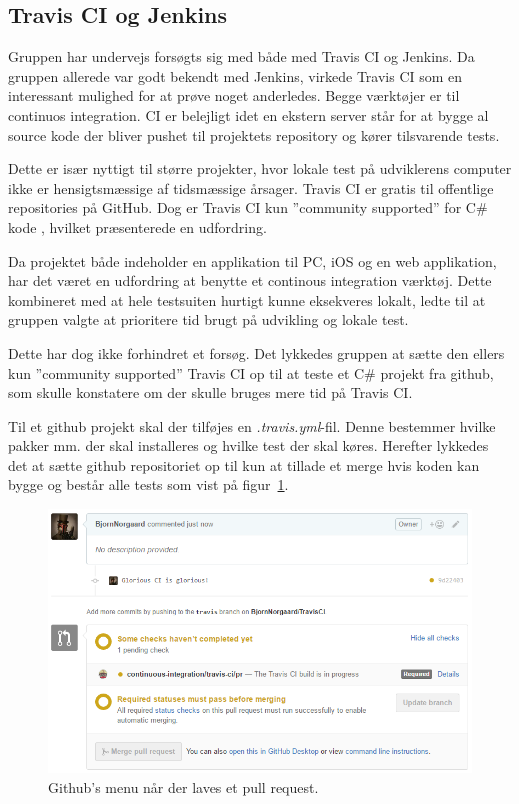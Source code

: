 \subsection{Travis CI og Jenkins}
Gruppen har undervejs forsøgts sig med både med Travis CI og Jenkins. Da gruppen allerede var godt bekendt med Jenkins, virkede Travis CI som en interessant mulighed for at prøve noget anderledes.
Begge værktøjer er til continuos integration. CI er belejligt idet en ekstern server står for at bygge al source kode der bliver pushet til projektets repository og kører tilsvarende tests.

Dette er især nyttigt til større projekter, hvor lokale test på udviklerens computer ikke er hensigtsmæssige af tidsmæssige årsager. Travis CI er gratis til offentlige repositories på GitHub. Dog er Travis CI kun ''community supported'' for C\# kode \cite{communitysupportedlanguages2016}, hvilket præsenterede en udfordring.

Da projektet både indeholder en applikation til PC, iOS og en web applikation, har det været en udfordring at benytte et continous integration værktøj.
Dette kombineret med at hele testsuiten hurtigt kunne eksekveres lokalt, ledte til at gruppen valgte at prioritere tid brugt på udvikling og lokale test.

Dette har dog ikke forhindret et forsøg. Det lykkedes gruppen at sætte den ellers kun ''community supported'' Travis CI op til at teste et C\# projekt fra github, som skulle konstatere om der skulle bruges mere tid på Travis CI. 

Til et github projekt skal der tilføjes en \textit{.travis.yml}-fil. Denne bestemmer hvilke pakker mm. der skal installeres og hvilke test der skal køres. 
Herefter lykkedes det at sætte github repositoriet op til kun at tillade et merge hvis koden kan bygge og består alle tests som vist på figur~\ref{fig:travispullrequest}.

\begin{figure}[h]
	\centering
	\includegraphics[width=0.9\linewidth]{figs/processProjektGennemforsel/travis/travispullrequest}
	\caption{Github's menu når der laves et pull request.}
	\label{fig:travispullrequest}
\end{figure}

